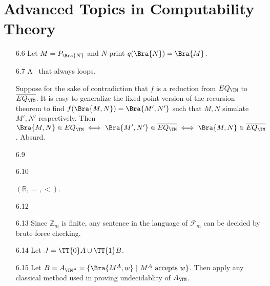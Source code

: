 \section{Advanced Topics in Computability Theory}

\begin{itemize}
	
	\item[6.6]
	Let $M = P_{\Bra{N}}$ and $N$ print $q(\Bra{N}) = \Bra{M}$.
	
	\item[6.7]
	A \TM\ that always loops.
	
	\item[\Star 6.8]
	Suppose for the sake of contradiction that $f$ is a reduction from $EQ_{\TM}$ to $\overline{EQ_{\TM}}$. It is easy to generalize the fixed-point version of the recursion theorem to find $f(\Bra{M, N}) = \Bra{M', N'}$ such that $M, N$ simulate $M', N'$ respectively. Then $\Bra{M, N} \in EQ_{\TM} \iff \Bra{M', N'} \in \overline{EQ_{\TM}} \iff \Bra{M, N} \in \overline{EQ_{\TM}}$. Absurd.
	
	\item[6.9]
	\Omit
	
	\item[6.10]
	\Omit
	
	\item[\Star 6.11]
	$(\mathbb{R}, =, <)$.
	
	\item[6.12]
	\Omit
	
	\item[6.13]
	Since $\mathbb{Z}_m$ is finite, any sentence in the language of $\mathcal{F}_m$ can be decided by brute-force checking.
	
	\item[6.14]
	Let $J = \TT{0}A \cup \TT{1}B$.
	
	\item[6.15]
	Let $B = A_{\TM^A} = \{ \Bra{M^{A}, w} \ | \ \text{$M^A$ accepts $w$} \}$. Then apply any classical method used in proving undecidablity of $A_{\TM}$.
	

\end{itemize}
